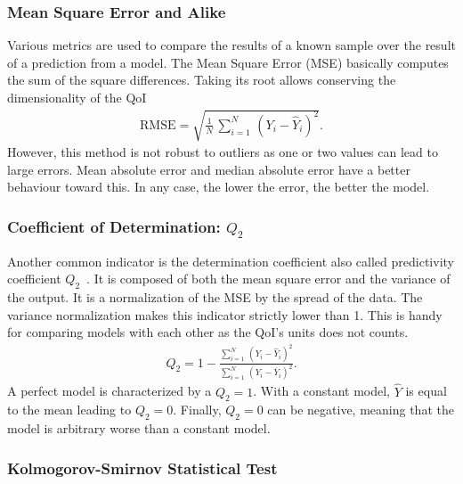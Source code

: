 \subsubsection{Mean Square Error and Alike}
Various metrics are used to compare the results of a known sample over the result of a prediction from a model. The Mean Square Error (MSE) basically computes the sum of the square differences. Taking its root allows conserving the dimensionality of the QoI
\begin{align}
\text{RMSE} = \sqrt{\frac{1}{N}\,
\displaystyle\sum_{i = 1}^{N}\,(Y_i - \hat{Y}_{i})^2}.
\end{align}
However, this method is not robust to outliers as one or two values can lead to large errors. Mean absolute error and median absolute error have a better behaviour toward this. In any case, the lower the error, the better the model.

\subsubsection{Coefficient of Determination: $Q_2$}
Another common indicator is the determination coefficient also called predictivity coefficient $Q_2$~\citep{marrel2009}. It is composed of both the mean square error and the variance of the output. It is a normalization of the MSE by the spread of the data. The variance normalization makes this indicator strictly lower than 1. This is handy for comparing models with each other as the QoI's units does not counts.
\begin{align} 
Q_{2} = 1 - \frac{\displaystyle\sum_{i = 1}^{N}\,\left(Y_i - \widehat{Y}_i\right)^2}{\displaystyle\sum_{i = 1}^{N}\,\left(Y_{i} - \overline{Y}_i\right)^2}.
\end{align}
A perfect model is characterized by a $Q_2=1$. With a constant model, $\hat{Y}$ is equal to the mean leading to $Q_2=0$. Finally, $Q_2=0$ can be negative, meaning that the model is arbitrary worse than a constant model.

\subsubsection{Kolmogorov-Smirnov Statistical Test}

